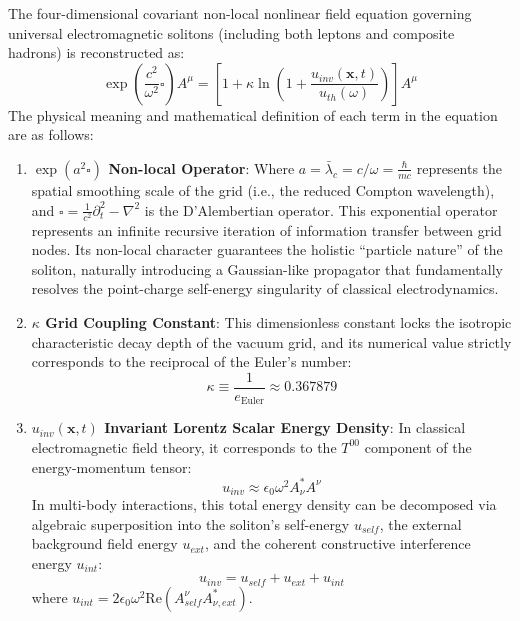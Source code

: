 \documentclass[12pt, a4paper]{article}
\begin{document}
The four-dimensional covariant non-local nonlinear field equation governing universal electromagnetic solitons (including both leptons and composite hadrons) is reconstructed as:
\begin{equation}
\exp\left( \frac{c^2}{\omega^2} \square \right) A^\mu = \left[ 1 + \kappa \ln\left(1 + \frac{u_{inv}(\mathbf{x}, t)}{u_{th}(\omega)}\right) \right] A^\mu \label{eq:field_eq}
\end{equation}
The physical meaning and mathematical definition of each term in the equation are as follows:
\begin{enumerate}
    \item \textbf{$\exp(a^2\square)$ Non-local Operator}:  
    Where $a = \bar{\lambda}_c = c/\omega = \frac{\hbar}{mc}$ represents the spatial smoothing scale of the grid (i.e., the reduced Compton wavelength), and $\square = \frac{1}{c^2}\partial_t^2 - \nabla^2$ is the D'Alembertian operator. This exponential operator represents an infinite recursive iteration of information transfer between grid nodes. Its non-local character guarantees the holistic ``particle nature'' of the soliton, naturally introducing a Gaussian-like propagator that fundamentally resolves the point-charge self-energy singularity of classical electrodynamics.
    
    \item \textbf{$\kappa$ Grid Coupling Constant}:  
    This dimensionless constant locks the isotropic characteristic decay depth of the vacuum grid, and its numerical value strictly corresponds to the reciprocal of the Euler's number:
    \begin{equation}
    \kappa \equiv \frac{1}{e_{\text{Euler}}} \approx 0.367879 \label{eq:kappa}
    \end{equation}
    
    \item \textbf{$u_{inv}(\mathbf{x}, t)$ Invariant Lorentz Scalar Energy Density}:  
    In classical electromagnetic field theory, it corresponds to the $T^{00}$ component of the energy-momentum tensor:
    \begin{equation}
    u_{inv} \approx \epsilon_0 \omega^2 A_\nu^* A^\nu \label{eq:u_inv}
    \end{equation}
    In multi-body interactions, this total energy density can be decomposed via algebraic superposition into the soliton's self-energy $u_{self}$, the external background field energy $u_{ext}$, and the coherent constructive interference energy $u_{int}$:
    \begin{equation}
    u_{inv} = u_{self} + u_{ext} + u_{int} \label{eq:u_inv_sum}
    \end{equation}
    where $u_{int} = 2\epsilon_0 \omega^2 \text{Re}(A_{self}^\nu A_{\nu, ext}^*)$.
    

\end{enumerate}
\end{document}
